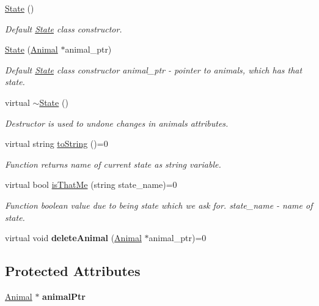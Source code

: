 \begin{DoxyCompactItemize}
\item 
\hyperlink{class_state_ab91bb1dd5aa6260ab2a456581daf9ec2}{State} ()
\begin{DoxyCompactList}\small\item\em Default \hyperlink{class_state}{State} class constructor. \end{DoxyCompactList}\item 
\hyperlink{class_state_ada7fbeef8c2d2d745693ff78ae02f47f}{State} (\hyperlink{class_animal}{Animal} $\ast$animal\+\_\+ptr)
\begin{DoxyCompactList}\small\item\em Default \hyperlink{class_state}{State} class constructor  animal\+\_\+ptr -\/ pointer to animals, which has that state. \end{DoxyCompactList}\item 
virtual \hyperlink{class_state_a9ddc1df6f998184d6477b48fab90281c}{$\sim$\+State} ()
\begin{DoxyCompactList}\small\item\em Destructor is used to undone changes in animal\textquotesingle{}s attributes. \end{DoxyCompactList}\item 
virtual string \hyperlink{class_state_afabc279037b4526ec161e6f8988855a9}{to\+String} ()=0
\begin{DoxyCompactList}\small\item\em Function returns name of current state as string variable. \end{DoxyCompactList}\item 
virtual bool \hyperlink{class_state_a049e4e2c7902faf26c7ac5f24f18fccb}{is\+That\+Me} (string state\+\_\+name)=0
\begin{DoxyCompactList}\small\item\em Function boolean value due to being state which we ask for.  state\+\_\+name -\/ name of state. \end{DoxyCompactList}\item 
\hypertarget{class_state_ada2495a9b5e28528e60d876aeef554b4}{}virtual void {\bfseries delete\+Animal} (\hyperlink{class_animal}{Animal} $\ast$animal\+\_\+ptr)=0\label{class_state_ada2495a9b5e28528e60d876aeef554b4}

\end{DoxyCompactItemize}
\subsection*{Protected Attributes}
\begin{DoxyCompactItemize}
\item 
\hypertarget{class_state_a85c79cfc2aa0d4150de1181e4c41c8ef}{}\hyperlink{class_animal}{Animal} $\ast$ {\bfseries animal\+Ptr}\label{class_state_a85c79cfc2aa0d4150de1181e4c41c8ef}

\end{DoxyCompactItemize}


